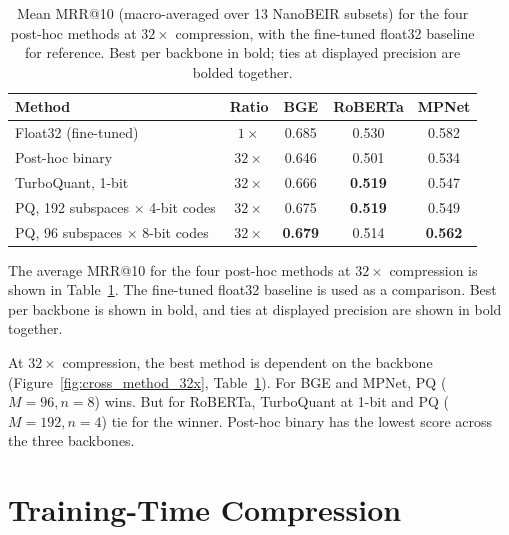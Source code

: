 \begin{table}[H]
  \centering
  \caption[Four post-hoc methods at $32\times$ vs float32 baseline.]{Mean MRR@10 (macro-averaged over 13 NanoBEIR subsets) for the four post-hoc methods at $32\times$ compression, with the fine-tuned float32 baseline for reference. Best per backbone in bold; ties at displayed precision are bolded together.}
  \label{tab:cross_method_32x}
  \begin{tabular}{| l | c | c | c | c |}
    \hline
    \textbf{Method} & \textbf{Ratio} & \textbf{BGE} & \textbf{RoBERTa} & \textbf{MPNet} \\ [0.5ex] \hline
    Float32 (fine-tuned)                   & $1\times$  & 0.685          & 0.530          & 0.582          \\ \hline
    Post-hoc binary                        & $32\times$ & 0.646          & 0.501          & 0.534          \\ \hline
    TurboQuant, 1-bit                      & $32\times$ & 0.666          & \textbf{0.519} & 0.547          \\ \hline
    PQ, 192 subspaces $\times$ 4-bit codes & $32\times$ & 0.675          & \textbf{0.519} & 0.549          \\ \hline
    PQ, 96 subspaces $\times$ 8-bit codes  & $32\times$ & \textbf{0.679} & 0.514          & \textbf{0.562} \\ \hline
  \end{tabular}
\end{table}

The average MRR@10 for the four post-hoc methods at $32\times$
compression is shown in Table~\ref{tab:cross_method_32x}. The
fine-tuned float32 baseline is used as a comparison. Best per backbone
is shown in bold, and ties at displayed precision are shown in bold
together.

At $32\times$ compression, the best method is dependent on the backbone
(Figure~\ref{fig:cross_method_32x}, Table~\ref{tab:cross_method_32x}).
For BGE and MPNet, PQ ($M{=}96, n{=}8$) wins. But for RoBERTa,
TurboQuant at 1-bit and PQ ($M{=}192, n{=}4$) tie for the winner.
Post-hoc binary has the lowest score across the three backbones.

\section{Training-Time Compression}
\label{sec:training_compression}

